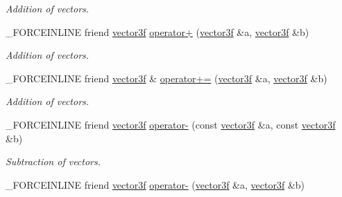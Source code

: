 \begin{DoxyCompactItemize}
\begin{DoxyCompactList}\small\item\em Addition of vectors. \end{DoxyCompactList}\item 
\hypertarget{classbt_1_1vector3f_a879dc782aaccb495c27946e378a0c227}{\-\_\-\-F\-O\-R\-C\-E\-I\-N\-L\-I\-N\-E friend \hyperlink{classbt_1_1vector3f}{vector3f} \hyperlink{classbt_1_1vector3f_a879dc782aaccb495c27946e378a0c227}{operator+} (\hyperlink{classbt_1_1vector3f}{vector3f} \&a, \hyperlink{classbt_1_1vector3f}{vector3f} \&b)}\label{classbt_1_1vector3f_a879dc782aaccb495c27946e378a0c227}

\begin{DoxyCompactList}\small\item\em Addition of vectors. \end{DoxyCompactList}\item 
\hypertarget{classbt_1_1vector3f_a7a587e28a0611cb7443d11d9ddc7030d}{\-\_\-\-F\-O\-R\-C\-E\-I\-N\-L\-I\-N\-E friend \hyperlink{classbt_1_1vector3f}{vector3f} \& \hyperlink{classbt_1_1vector3f_a7a587e28a0611cb7443d11d9ddc7030d}{operator+=} (\hyperlink{classbt_1_1vector3f}{vector3f} \&a, \hyperlink{classbt_1_1vector3f}{vector3f} \&b)}\label{classbt_1_1vector3f_a7a587e28a0611cb7443d11d9ddc7030d}

\begin{DoxyCompactList}\small\item\em Addition of vectors. \end{DoxyCompactList}\item 
\hypertarget{classbt_1_1vector3f_a0782c11ab3ae757af6e6f1490724e882}{\-\_\-\-F\-O\-R\-C\-E\-I\-N\-L\-I\-N\-E friend \hyperlink{classbt_1_1vector3f}{vector3f} \hyperlink{classbt_1_1vector3f_a0782c11ab3ae757af6e6f1490724e882}{operator-\/} (const \hyperlink{classbt_1_1vector3f}{vector3f} \&a, const \hyperlink{classbt_1_1vector3f}{vector3f} \&b)}\label{classbt_1_1vector3f_a0782c11ab3ae757af6e6f1490724e882}

\begin{DoxyCompactList}\small\item\em Subtraction of vectors. \end{DoxyCompactList}\item 
\hypertarget{classbt_1_1vector3f_a9b4e24539b4ff4965d74cf77bc7b1945}{\-\_\-\-F\-O\-R\-C\-E\-I\-N\-L\-I\-N\-E friend \hyperlink{classbt_1_1vector3f}{vector3f} \hyperlink{classbt_1_1vector3f_a9b4e24539b4ff4965d74cf77bc7b1945}{operator-\/} (\hyperlink{classbt_1_1vector3f}{vector3f} \&a, \hyperlink{classbt_1_1vector3f}{vector3f} \&b)}\label{classbt_1_1vector3f_a9b4e24539b4ff4965d74cf77bc7b1945}


\end{DoxyCompactItemize}
